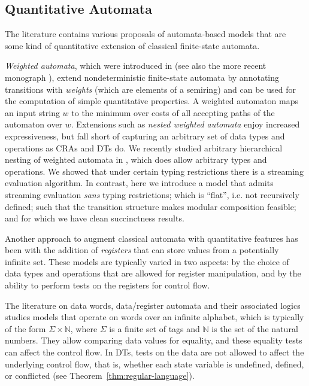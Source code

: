 
\subsection{Quantitative Automata}

The literature contains various proposals of automata-based models that are some kind of quantitative extension of classical finite-state automata.

\emph{Weighted automata}, which were introduced in \cite{S1961WA} (see also the more recent monograph \cite{DKV2009HWA}), extend nondeterministic finite-state automata by annotating transitions with \emph{weights} (which are elements of a semiring) and can be used for the computation of simple quantitative properties. A weighted automaton maps an input string $w$ to the minimum over costs of all accepting paths of the automaton over $w$.
Extensions such as \emph{nested weighted automata} \cite{CHO2015NWA} enjoy increased expressiveness, but fall short of capturing an arbitrary set of data types and operations as CRAs and DTs do. We recently studied arbitrary hierarchical nesting of weighted automata in \cite{AMS2017SA}, which does allow arbitrary types and operations. We showed that under certain typing restrictions there is a streaming evaluation algorithm. In contrast, here we introduce a model that admits streaming evaluation \emph{sans} typing restrictions; which is ``flat'', i.e. not recursively defined; such that the transition structure makes modular composition feasible; and for which we have clean succinctness results.

Another approach to augment classical automata with quantitative features has been with the addition of \emph{registers} that can store values from a potentially infinite set. These models are typically varied in two aspects: by the choice of data types and operations that are allowed for register manipulation, and by the ability to perform tests on the registers for control flow.

The literature on data words, data/register automata and their associated logics \cite{KF1994FMA, NSV2004FSM, DL2009LFQ, BS2010NRDL, BDMSS2011LDW} studies models that operate on words over an infinite alphabet, which is typically of the form $\Sigma \times \mathbb{N}$, where $\Sigma$ is a finite set of tags and $\mathbb{N}$ is the set of the natural numbers. They allow comparing data values for equality, and these equality tests can affect the control flow.
In DTs, tests on the data are not allowed to affect the underlying control flow, that is, whether each state variable is undefined, defined, or conflicted (see Theorem~\ref{thm:regular-language}).

